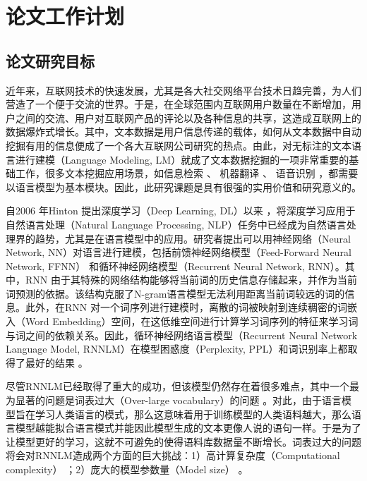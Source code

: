 \documentclass[12pt,a4paper]{article}
\begin{document}
\section{论文工作计划}
\label{sec:intro}

\subsection{论文研究目标}

近年来，互联网技术的快速发展，尤其是各大社交网络平台技术日趋完善，为人们营造了一个便于交流的世界。于是，在全球范围内互联网用户数量在不断增加，用户之间的交流、用户对互联网产品的评论以及各种信息的共享，这造成互联网上的数据爆炸式增长。其中，文本数据是用户信息传递的载体，如何从文本数据中自动挖掘有用的信息便成了一个各大互联网公司研究的热点。由此，对无标注的文本语言进行建模（Language Modeling, LM）就成了文本数据挖掘的一项非常重要的基础工作，很多文本挖掘应用场景，如信息检索 \cite{Jin:2002:TLM:564376.564386}、 机器翻译 \cite{DBLP:conf/naacl/BaltescuB15}、 语音识别 \cite{DBLP:conf/interspeech/SakSB14}，都需要以语言模型为基本模块。因此，此研究课题是具有很强的实用价值和研究意义的。

自2006 年Hinton 提出深度学习（Deep Learning, DL）以来 \cite{hinton2006reducing}，将深度学习应用于自然语言处理（Natural Language Processing, NLP）任务中已经成为自然语言处理界的趋势，尤其是在语言模型中的应用。研究者提出可以用神经网络（Neural Network, NN）对语言进行建模，包括前馈神经网络模型（Feed-Forward Neural Network, FFNN）\cite{DBLP:conf/nips/BengioDV00} 和循环神经网络模型（Recurrent Neural Network, RNN）\cite{DBLP:conf/interspeech/MikolovKBCK10}。其中，RNN 由于其特殊的网络结构能够将当前词的历史信息存储起来，并作为当前词预测的依据。该结构克服了N-gram语言模型无法利用距离当前词较远的词的信息。此外，在RNN 对一个词序列进行建模时，离散的词被映射到连续稠密的词嵌入（Word Embedding）空间，在这低维空间进行计算学习词序列的特征来学习词与词之间的依赖关系。因此，循环神经网络语言模型（Recurrent Neural Network Language Model, RNNLM）在模型困惑度（Perplexity, PPL）和词识别率上都取得了最好的结果 \cite{DBLP:conf/icassp/MikolovKBCK11}。

尽管RNNLM已经取得了重大的成功，但该模型仍然存在着很多难点，其中一个最为显著的问题是词表过大（Over-large vocabulary）的问题 \cite{DBLP:conf/interspeech/ChenWLGW14}。对此，由于语言模型旨在学习人类语言的模式，那么这意味着用于训练模型的人类语料越大，那么语言模型越能拟合语言模式并能因此模型生成的文本更像人说的语句一样。于是为了让模型更好的学习，这就不可避免的使得语料库数据量不断增长。词表过大的问题将会对RNNLM造成两个方面的巨大挑战：1）高计算复杂度（Computational complexity） \cite{DBLP:conf/acl/ChenGA16}；2）庞大的模型参数量（Model size） \cite{DBLP:conf/nips/LiQYHL16}。
\end{document}
